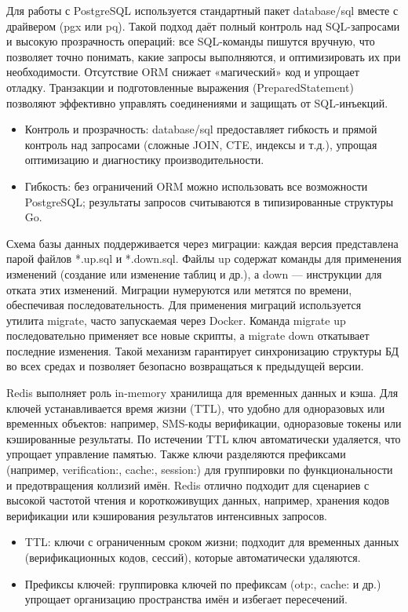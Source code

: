 Для работы с PostgreSQL используется стандартный пакет database/sql вместе с драйвером (pgx или pq). Такой подход даёт полный контроль над SQL-запросами и высокую прозрачность операций: все SQL-команды пишутся вручную, что позволяет точно понимать, какие запросы выполняются, и оптимизировать их при необходимости. Отсутствие ORM снижает «магический» код и упрощает отладку. Транзакции и подготовленные выражения (PreparedStatement) позволяют эффективно управлять соединениями и защищать от SQL-инъекций.

\begin{itemize}
    \item Контроль и прозрачность: database/sql предоставляет гибкость и прямой контроль над запросами (сложные JOIN, CTE, индексы и т.д.), упрощая оптимизацию и диагностику производительности.
    \item Гибкость: без ограничений ORM можно использовать все возможности PostgreSQL; результаты запросов считываются в типизированные структуры Go.
\end{itemize}

\noindent Схема базы данных поддерживается через миграции: каждая версия представлена парой файлов *.up.sql и *.down.sql. Файлы up содержат команды для применения изменений (создание или изменение таблиц и др.), а down — инструкции для отката этих изменений. Миграции нумеруются или метятся по времени, обеспечивая последовательность. Для применения миграций используется утилита migrate, часто запускаемая через Docker. Команда migrate up последовательно применяет все новые скрипты, а migrate down откатывает последние изменения. Такой механизм гарантирует синхронизацию структуры БД во всех средах и позволяет безопасно возвращаться к предыдущей версии.

Redis выполняет роль in-memory хранилища для временных данных и кэша. Для ключей устанавливается время жизни (TTL), что удобно для одноразовых или временных объектов: например, SMS-коды верификации, одноразовые токены или кэшированные результаты. По истечении TTL ключ автоматически удаляется, что упрощает управление памятью. Также ключи разделяются префиксами (например, verification:, cache:, session:) для группировки по функциональности и предотвращения коллизий имён. Redis отлично подходит для сценариев с высокой частотой чтения и короткоживущих данных, например, хранения кодов верификации или кэширования результатов интенсивных запросов.

\begin{itemize}
    \item TTL: ключи с ограниченным сроком жизни; подходит для временных данных (верификационных кодов, сессий), которые автоматически удаляются.
    \item Префиксы ключей: группировка ключей по префиксам (otp:, cache: и др.) упрощает организацию пространства имён и избегает пересечений.
\end{itemize}

